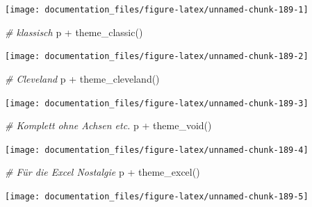 \documentclass[
]{article}
\newenvironment{Shaded}{\begin{snugshade}}{\end{snugshade}}
\newcommand{\CommentTok}[1]{\textcolor[rgb]{0.56,0.35,0.01}{\textit{#1}}}
\newcommand{\FunctionTok}[1]{\textcolor[rgb]{0.00,0.00,0.00}{#1}}
\newcommand{\NormalTok}[1]{#1}
\newcommand{\SpecialCharTok}[1]{\textcolor[rgb]{0.00,0.00,0.00}{#1}}
\begin{document}
\begin{center}\texttt{[image: documentation\_files/figure-latex/unnamed-chunk-189-1]} \end{center}

\begin{Shaded}
\begin{Highlighting}[]
\CommentTok{\# klassisch}
\NormalTok{p }\SpecialCharTok{+} \FunctionTok{theme\_classic}\NormalTok{()}
\end{Highlighting}
\end{Shaded}

\begin{center}\texttt{[image: documentation\_files/figure-latex/unnamed-chunk-189-2]} \end{center}

\begin{Shaded}
\begin{Highlighting}[]
\CommentTok{\# Cleveland}
\NormalTok{p }\SpecialCharTok{+} \FunctionTok{theme\_cleveland}\NormalTok{()}
\end{Highlighting}
\end{Shaded}

\begin{center}\texttt{[image: documentation\_files/figure-latex/unnamed-chunk-189-3]} \end{center}

\begin{Shaded}
\begin{Highlighting}[]
\CommentTok{\# Komplett ohne Achsen etc. }
\NormalTok{p }\SpecialCharTok{+} \FunctionTok{theme\_void}\NormalTok{()}
\end{Highlighting}
\end{Shaded}

\begin{center}\texttt{[image: documentation\_files/figure-latex/unnamed-chunk-189-4]} \end{center}

\begin{Shaded}
\begin{Highlighting}[]
\CommentTok{\# Für die Excel Nostalgie}
\NormalTok{p }\SpecialCharTok{+} \FunctionTok{theme\_excel}\NormalTok{()}
\end{Highlighting}
\end{Shaded}

\begin{center}\texttt{[image: documentation\_files/figure-latex/unnamed-chunk-189-5]} \end{center}
\end{document}
